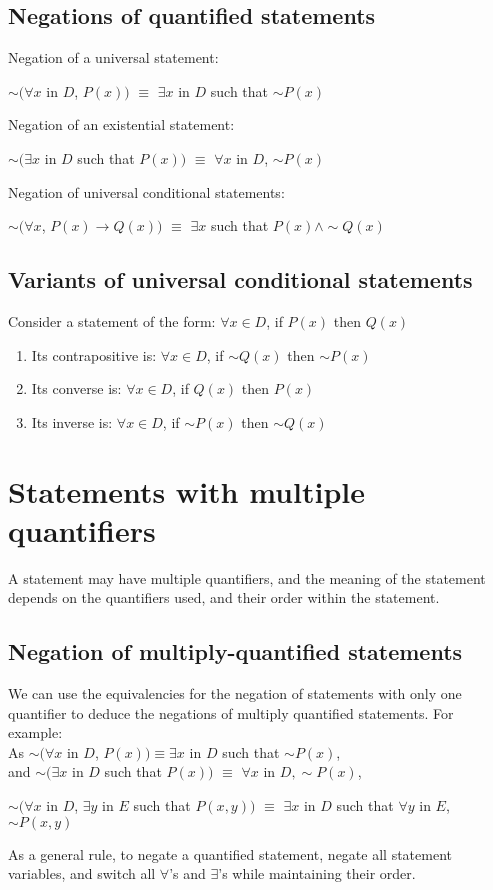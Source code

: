 \documentclass[a4paper]{article}
\begin{document}
\subsection{Negations of quantified statements}
Negation of a universal statement:
\begin{center}
	$\sim(\forall x$ in $D$, $P(x))$ $\equiv$ $\exists x$ in $D$ such that $\sim P(x)$
\end{center}
Negation of an existential statement:
\begin{center}
	$\sim(\exists x$ in $D$ such that $P(x))$ $\equiv$ $\forall x$ in $D$, $\sim P(x)$
\end{center}
Negation of universal conditional statements:
\begin{center}
	$\sim (\forall x$, $P(x) \rightarrow Q(x))$ $\equiv$ $\exists x$ such that $P(x) \land \sim Q(x)$
\end{center}

\subsection{Variants of universal conditional statements}
Consider a statement of the form: $\forall x \in D$, if $P(x)$ then $Q(x)$
\begin{enumerate}
	\item Its contrapositive is: $\forall x \in D$, if $\sim Q(x)$ then $\sim P(x)$
	\item Its converse is: $\forall x \in D$, if $Q(x)$ then $P(x)$
	\item Its inverse is: $\forall x \in D$, if $\sim P(x)$ then $\sim Q(x)$
\end{enumerate}
\section{Statements with multiple quantifiers}
A statement may have multiple quantifiers, and the meaning of the statement depends on the quantifiers used, and their order within the statement.

\subsection{Negation of multiply-quantified statements}
We can use the equivalencies for the negation of statements with only one quantifier to deduce the negations of multiply quantified statements. For example:\\
As $\sim(\forall x$ in $D$, $P(x)) \equiv \exists x$ in $D$ such that $\sim P(x)$,\\ and $\sim (\exists x$ in $D$ such that $P(x))$ $\equiv$ $\forall x$ in $D, \sim P(x)$,
\begin{center}
	$\sim (\forall x$ in $D$, $\exists y$ in $E$ such that $P(x,y))$ $\equiv$ $\exists x$ in $D$ such that $\forall y$ in  $E$, $\sim P(x,y)$
\end{center}
As a general rule, to negate a quantified statement, negate all statement variables, and switch all $\forall$'s and $\exists$'s while maintaining their order.
\end{document}
